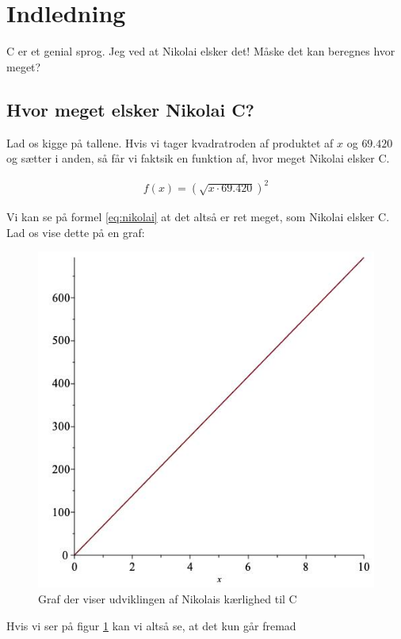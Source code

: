 \section{Indledning}
C er et genial sprog\cite{C-bog}. Jeg ved at Nikolai elsker det! Måske det kan beregnes hvor meget?

\subsection{Hvor meget elsker Nikolai C?}
Lad os kigge på tallene. Hvis vi tager kvadratroden af produktet af $x$ og $69.420$ og sætter i anden, så får vi faktsik en funktion af, hvor meget Nikolai elsker C.

\begin{gather}
    \label{eq:nikolai}
    f(x) = (\sqrt{x \cdot 69.420})^2
\end{gather}

Vi kan se på formel \ref{eq:nikolai} at det altså er ret meget, som Nikolai elsker C. Lad os vise dette på en graf:

\begin{figure}[h!]
    \centering
    \includegraphics[width=0.8\linewidth]{Figurer/Nikolai-c.jpg}
    \caption{Graf der viser udviklingen af Nikolais kærlighed til C}
    \label{fig:nikolai-c}
\end{figure}

\noindent %
Hvis vi ser på figur \ref{fig:nikolai-c} kan vi altså se, at det kun går fremad